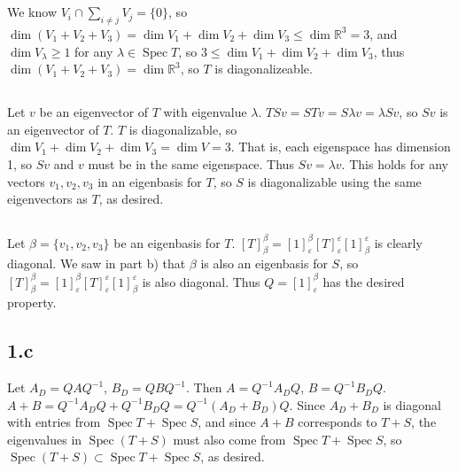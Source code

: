 \documentclass[11pt]{article}
\DeclareMathOperator{\spec}{Spec}
\begin{document}
\renewcommand{\thesubsection}{\thesection.\alph{subsection}}
\section{} %
\subsection{} %
We know $V_i\cap\sum_{i\neq j}V_j=\{0\}$, so
$\dim(V_1+V_2+V_3)=\dim V_1+\dim V_2+\dim V_3\le\dim\mathbb{R}^3=3$, and
$\dim V_\lambda\ge1$ for any $\lambda\in\spec T$, so
$3\le\dim V_1+\dim V_2+\dim V_3$, thus $\dim(V_1+V_2+V_3)=\dim\mathbb{R}^3$,
so $T$ is diagonalizeable.


\subsection{} %
Let $v$ be an eigenvector of $T$ with eigenvalue $\lambda$. $TSv=STv=S\lambda
v=\lambda Sv$, so $Sv$ is an eigenvector of $T$. $T$ is diagonalizable, so
$\dim V_1+\dim V_2+\dim V_3=\dim V=3$. That is, each eigenspace has dimension
1, so $Sv$ and $v$ must be in the same eigenspace. Thus $Sv=\lambda v$. This
holds for any vectors $v_1,v_2,v_3$ in an eigenbasis for $T$, so $S$ is
diagonalizable using the same eigenvectors as $T$, as desired.


\subsection{} %
Let $\beta=\{v_1,v_2,v_3\}$ be an eigenbasis for $T$.
$\left[T\right]_\beta^\beta=\left[1\right]_\varepsilon^\beta\left[T\right]_\varepsilon^\varepsilon\left[1\right]_\beta^\varepsilon$
is clearly diagonal. We saw in part b) that $\beta$ is also an eigenbasis for
$S$, so $\left[T\right]_\beta^\beta=\left[1\right]_\varepsilon^\beta\left[T\right]_\varepsilon^\varepsilon\left[1\right]_\beta^\varepsilon$
is also diagonal. Thus $Q=\left[1\right]_\varepsilon^\beta$ has the desired
property.


\subsection*{1.c} %
Let $A_D=QAQ^{-1}$, $B_D=QBQ^{-1}$. Then $A=Q^{-1}A_DQ$, $B=Q^{-1}B_DQ$.
$A+B=Q^{-1}A_DQ+Q^{-1}B_DQ=Q^{-1}(A_D+B_D)Q$. Since $A_D+B_D$ is diagonal with
entries from $\spec T+\spec S$, and since $A+B$ corresponds to $T+S$, the
eigenvalues in $\spec(T+S)$ must also come from $\spec T+\spec S$, so
$\spec(T+S)\subset\spec T+\spec S$, as desired.
\end{document}
